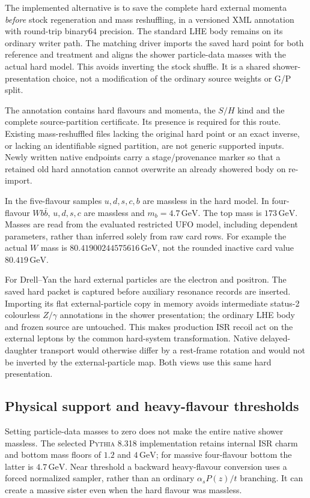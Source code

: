 \documentclass[11pt,a4paper]{article}
\newcommand{\pythia}{\textsc{Pythia}}
\newcommand{\as}{\alpha_s}
\newcommand{\GeV}{\,\mathrm{GeV}}
\begin{document}
The implemented alternative is to save the complete hard external
momenta \emph{before} stock regeneration and mass reshuffling, in a
versioned XML annotation with round-trip binary64 precision. The standard LHE
body remains on its ordinary writer path. The matching driver imports
the saved hard point for both reference and treatment and aligns the
shower particle-data masses with the actual hard model. This avoids
inverting the stock shuffle. It is a shared shower-presentation choice,
not a modification of the ordinary source weights or G/P split.

The annotation contains hard flavours and momenta, the $S/H$ kind and
the complete source-partition certificate. Its presence is required for
this route. Existing mass-reshuffled files lacking the original hard
point or an exact inverse, or lacking an identifiable signed partition,
are not generic supported inputs. Newly written native endpoints carry
a stage/provenance marker so that a retained old hard annotation cannot
overwrite an already showered body on re-import.

In the five-flavour samples $u,d,s,c,b$ are massless in the hard model.
In four-flavour $Wb\bar b$, $u,d,s,c$ are massless and $m_b=4.7\GeV$.
The top mass is $173\GeV$. Masses are read from the evaluated restricted
UFO model, including dependent parameters, rather than inferred solely
from raw card rows. For example the actual $W$ mass is
$80.41900244575616\GeV$, not the rounded inactive card value
$80.419\GeV$.

For Drell--Yan the hard external particles are the electron and
positron. The saved hard packet is captured before auxiliary resonance
records are inserted. Importing its flat external-particle copy in
memory avoids intermediate status-2 colourless $Z/\gamma$ annotations
in the shower presentation; the ordinary LHE body and frozen source
are untouched. This makes production ISR recoil act on the external
leptons by the common hard-system transformation. Native delayed-daughter
transport would otherwise differ by a rest-frame rotation and would
not be inverted by the external-particle map. Both views use this
same hard presentation.

\subsection{Physical support and heavy-flavour thresholds}
\label{sec:thresholds}
Setting particle-data masses to zero does not make the entire native
shower massless. The selected \pythia{} 8.318 implementation retains
internal ISR charm and bottom mass floors of $1.2$ and $4\GeV$;
for massive four-flavour bottom the latter is $4.7\GeV$.
Near threshold a backward heavy-flavour conversion uses a forced
normalized sampler, rather than an ordinary $\as P(z)/t$ branching.
It can create a massive sister even when the hard flavour was massless.
\end{document}
